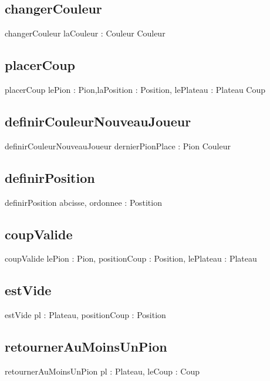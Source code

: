 \documentclass{article}
\begin{document}
	\subsection{changerCouleur}
		\begin{algorithme}
			\signaturefonction
				{changerCouleur}
				{laCouleur : Couleur}
				{Couleur}
		\end{algorithme}

	\subsection{placerCoup}
		\begin{algorithme}
			\signaturefonction
				{placerCoup}
				{lePion : Pion,laPosition : Position, lePlateau : Plateau}
				{Coup}
		\end{algorithme}
	\subsection{definirCouleurNouveauJoueur}
		\begin{algorithme}
			\signaturefonction
				{definirCouleurNouveauJoueur}
				{dernierPionPlace : Pion}
				{Couleur}
		\end{algorithme}
	\subsection{definirPosition}
		\begin{algorithme}
			\signaturefonction
				{definirPosition}
				{abcisse, ordonnee : \caractere}
				{Postition}
		\end{algorithme}
	\subsection{coupValide}
		\begin{algorithme}
			\signaturefonction
				{coupValide}
				{lePion : Pion, positionCoup : Position, lePlateau : Plateau}
				{\booleen}
		\end{algorithme}
	\subsection{estVide}
		\begin{algorithme}
			\signaturefonction
				{estVide}
				{pl : Plateau, positionCoup : Position}
				{\booleen}
		\end{algorithme}
	\subsection{retournerAuMoinsUnPion}
		\begin{algorithme}
			\signaturefonction
				{retournerAuMoinsUnPion}
				{pl : Plateau, leCoup : Coup}
				{\booleen}
		\end{algorithme}
\end{document}
